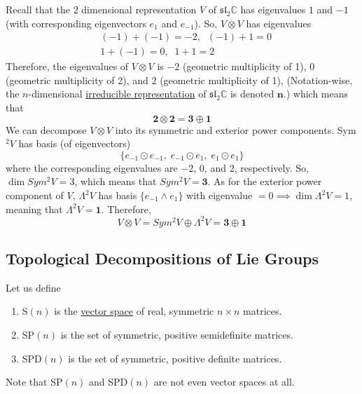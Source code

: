     \begin{example}
      \label{ex:weights-of-the-2-dimensional-representation}
      Recall that the $2$ dimensional representation $V$ of $\mathfrak{sl}_2 \mathbb{C}$ has eigenvalues $1$ and $-1$ (with corresponding eigenvectors $e_1$ and $e_{-1}$). So, $V \otimes V$ has eigenvalues 
      \begin{align*}
        & (-1) + (-1) = -2, \;\; (-1) + 1 = 0 \\
        & 1 + (-1) = 0, \;\; 1 + 1 = 2
      \end{align*}
      Therefore, the eigenvalues of $V \otimes V$ is $-2$ (geometric multiplicity of 1), $0$ (geometric multiplicity of 2), and $2$ (geometric multiplicity of 1), (Notation-wise, the $n$-dimensional \hyperref[def:irreducible-representation-2]{irreducible representation} of $\mathfrak{sl}_2 \mathbb{C}$ is denoted $\mathbf{n}$.) which means that
      \begin{equation}
        \mathbf{2} \otimes \mathbf{2} = \mathbf{3} \oplus \mathbf{1}
      \end{equation}
      We can decompose $V \otimes V$ into its symmetric and exterior power components. Sym$^2 V$ has basis (of eigenvectors)
      \begin{equation}
        \{e_{-1} \odot e_{-1}, \; e_{-1} \odot e_1, \; e_1 \odot e_1\}
      \end{equation}
      where the corresponding eigenvalues are $-2$, $0$, and $2$, respectively. So, $\dim{Sym^2 V} = 3$, which means that $Sym^2 V = \mathbf{3}$. As for the exterior power component of $V$, $\Lambda^2 V$ has basis $\{e_{-1} \wedge e_1\}$ with eigenvalue $= 0 \implies \dim{\Lambda^2 V} = 1$, meaning that $\Lambda^2 V = \mathbf{1}$. Therefore, 
      \begin{equation}
        V \otimes V = Sym^2 V \oplus \Lambda^2 V = \mathbf{3} \oplus \mathbf{1}
      \end{equation}
    \end{example}

\subsection{Topological Decompositions of Lie Groups}

  \begin{definition}
    \label{def:symmetric-and-positive-definite-matrix-spaces}
    Let us define 
    \begin{enumerate}
      \item S$(n)$ is the \hyperref[def:vector-space]{vector space} of real, symmetric $n \times n$ matrices. 
      \item SP$(n)$ is the set of symmetric, positive semidefinite matrices. 
      \item SPD$(n)$ is the set of symmetric, positive definite matrices. 
    \end{enumerate}
    Note that SP$(n)$ and SPD$(n)$ are not even vector spaces at all. 
  \end{definition}

